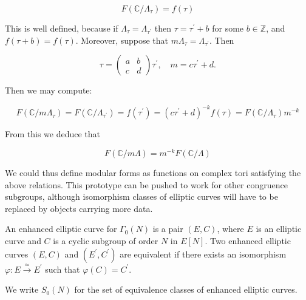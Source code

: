 $$
F\left(\mathbb{C} / \Lambda_{\tau}\right)=f(\tau)
$$

This is well defined, because if $\Lambda_{\tau}=\Lambda_{\tau^{\prime}}$ then $\tau=\tau^{\prime}+b$ for some $b \in \mathbb{Z}$, and $f(\tau+b)=f(\tau)$. Moreover, suppose that $m \Lambda_{\tau}=\Lambda_{\tau^{\prime}}$. Then

$$
\tau=\left(\begin{array}{ll}
a & b \\
c & d
\end{array}\right) \tau^{\prime}, \quad m=c \tau^{\prime}+d .
$$

Then we may compute:

$$
F\left(\mathbb{C} / m \Lambda_{\tau}\right)=F\left(\mathbb{C} / \Lambda_{\tau^{\prime}}\right)=f\left(\tau^{\prime}\right)=\left(c \tau^{\prime}+d\right)^{-k} f(\tau)=F\left(\mathbb{C} / \Lambda_{\tau}\right) m^{-k}
$$

From this we deduce that

$$
F(\mathbb{C} / m \Lambda)=m^{-k} F(\mathbb{C} / \Lambda)
$$

We could thus define modular forms as functions on complex tori satisfying the above relations. This prototype can be pushed to work for other congruence subgroups, although isomorphism classes of elliptic curves will have to be replaced by objects carrying more data.


\begin{definition}
    An enhanced elliptic curve for $\Gamma_{0}(N)$ is a pair $(E, C)$, where $E$ is an elliptic curve and $C$ is a cyclic subgroup of order $N$ in $E[N]$. Two enhanced elliptic curves $(E, C)$ and $\left(E^{\prime}, C^{\prime}\right)$ are equivalent if there exists an isomorphism $\varphi: E \stackrel{\simeq}{\rightarrow} E^{\prime}$ such that $\varphi(C)=C^{\prime}$.

We write $S_{0}(N)$ for the set of equivalence classes of enhanced elliptic curves.

\end{definition}

